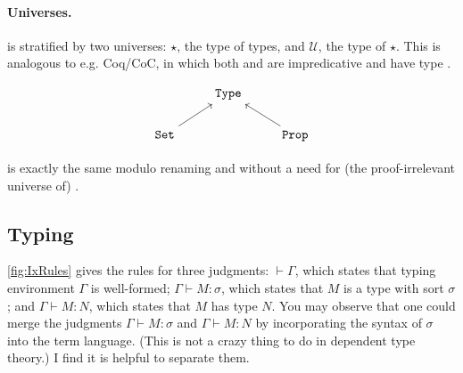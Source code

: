 \documentclass[authoryear,acmsmall,screen]{acmart}
\begin{document}
\paragraph{Universes.} \IX{} is stratified by two universes: $\star$, the type of types, and $\mathcal{U}$, the type of $\star$. This is analogous to e.g. Coq/CoC, in which both  and  are impredicative and have type .

\[\begin{tikzcd}
	& {\texttt{Type}} \\
	{\texttt{Set}} && {\texttt{Prop}}
	\arrow[from=2-1, to=1-2]
	\arrow[from=2-3, to=1-2]
\end{tikzcd}\]

\IX{} is exactly the same modulo renaming and without a need for (the proof-irrelevant universe of) .

\subsection{Typing}

\cref{fig:IxRules} gives the rules for three judgments: $\vdash \Gamma$, which states that typing environment $\Gamma$ is well-formed; $\Gamma \vdash M : \sigma$, which states that $M$ is a type with sort $\sigma$; and $\Gamma \vdash M : N$, which states that $M$ has type $N$. You may observe that one could merge the judgments $\Gamma \vdash M : \sigma$ and $\Gamma \vdash M : N$ by incorporating the syntax of $\sigma$ into the term language. (This is not a crazy thing to do in dependent type theory.) I find it is helpful to separate them.
\end{document}
